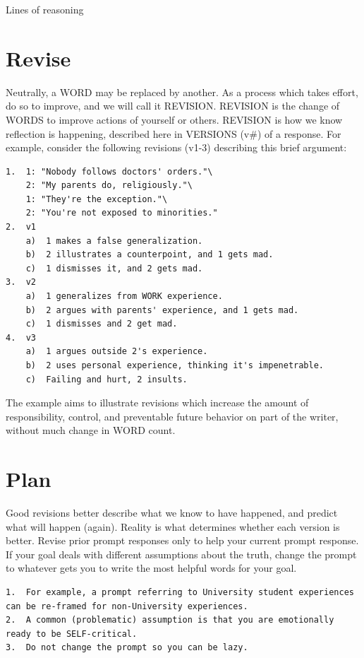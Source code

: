 \documentclass[
]{book}
\begin{document}
Lines of reasoning

\section{Revise}\label{word-change}

Neutrally, a WORD may be replaced by another. As a process which takes effort, do so to improve, and we will call it REVISION. REVISION is the change of WORDS to improve actions of yourself or others.
REVISION is how we know reflection is happening, described here in VERSIONS (v\#) of a response.
For example, consider the following revisions (v1-3) describing this brief argument:

\begin{verbatim}
1.  1: "Nobody follows doctors' orders."\
    2: "My parents do, religiously."\
    1: "They're the exception."\
    2: "You're not exposed to minorities."  
2.  v1  
    a)  1 makes a false generalization.
    b)  2 illustrates a counterpoint, and 1 gets mad.
    c)  1 dismisses it, and 2 gets mad.  
3.  v2  
    a)  1 generalizes from WORK experience.
    b)  2 argues with parents' experience, and 1 gets mad.
    c)  1 dismisses and 2 get mad.  
4.  v3  
    a)  1 argues outside 2's experience.
    b)  2 uses personal experience, thinking it's impenetrable.
    c)  Failing and hurt, 2 insults.  
\end{verbatim}

The example aims to illustrate revisions which increase the amount of responsibility, control, and preventable future behavior on part of the writer, without much change in WORD count.

\section{Plan}\label{change-plan}

Good revisions better describe what we know to have happened, and predict what will happen (again).
Reality is what determines whether each version is better.
Revise prior prompt responses only to help your current prompt response.
If your goal deals with different assumptions about the truth, change the prompt to whatever gets you to write the most helpful words for your goal.

\begin{verbatim}
1.  For example, a prompt referring to University student experiences can be re-framed for non-University experiences.
2.  A common (problematic) assumption is that you are emotionally ready to be SELF-critical.
3.  Do not change the prompt so you can be lazy.
\end{verbatim}
\end{document}
